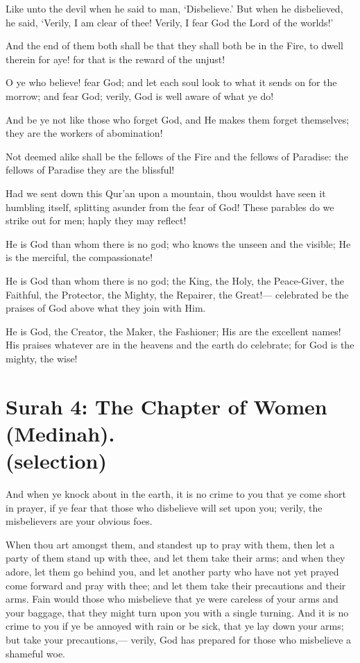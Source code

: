 \documentclass[fontsize=14pt, letterpaper, notitlepage, openany, DIV=12]{scrbook} %
\begin{document}
\noindent[59:16]
Like unto the devil when he said to man, `Disbelieve.' But when he disbelieved, he said,
`Verily, I am clear of thee! Verily, I fear God the Lord of the worlds!'

\noindent[59:17]
And the end of them both shall be that they shall both be in the Fire, to dwell therein for
aye! for that is the reward of the unjust!

\noindent[59:18]
O ye who believe! fear God; and let each soul look to what it sends on for the morrow;
and fear God; verily, God is well aware of what ye do!

\noindent[59:19]
And be ye not like those who forget God, and He makes them forget themselves; they are
the workers of abomination!

\noindent[59:20]
Not deemed alike shall be the fellows of the Fire and the fellows of Paradise: the fellows
of Paradise they are the blissful!

\noindent[59:21]
Had we sent down this Qur'an upon a mountain, thou wouldst have seen it humbling
itself, splitting asunder from the fear of God! These parables do we strike out for men; haply they
may reflect!

\noindent[59:22]
He is God than whom there is no god; who knows the unseen and the visible; He is the
merciful, the compassionate!

\noindent[59:23]
He is God than whom there is no god; the King, the Holy, the Peace-Giver, the Faithful,
the Protector, the Mighty, the Repairer, the Great!--- celebrated be the praises of God above what
they join with Him.

\noindent[59:24]
He is God, the Creator, the Maker, the Fashioner; His are the excellent names! His
praises whatever are in the heavens and the earth do celebrate; for God is the mighty, the wise!


\section[Surah 4: The Chapter of Women (Medinah).]{Surah 4: The Chapter of Women (Medinah).\\ (selection)}


\noindent[4:101]
And when ye knock about in the earth, it is no crime to you that ye come short in prayer,
if ye fear that those who disbelieve will set upon you; verily, the misbelievers are your obvious
foes.

\noindent[4:102]
When thou art amongst them, and standest up to pray with them, then let a party of them
stand up with thee, and let them take their arms; and when they adore, let them go behind you,
and let another party who have not yet prayed come forward and pray with thee; and let them
take their precautions and their arms. Fain would those who misbelieve that ye were careless of
your arms and your baggage, that they might turn upon you with a single turning. And it is no
crime to you if ye be annoyed with rain or be sick, that ye lay down your arms; but take your
precautions,--- verily, God has prepared for those who misbelieve a shameful woe.
\end{document}

